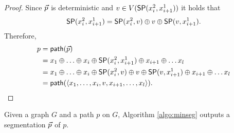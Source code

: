 \begin{proof}
Since $\sr{p}$ is deterministic and $v \in V(\sp(x^2_i, x^1_{i+1}))$ it holds that
$$
\sp(x^2_i, x^1_{i + 1}) = \sp(x^2_i, v) \oplus v \oplus \sp(v, x^1_{i + 1}).
$$
Therefore,
\begin{align*}
p & = \seq(\sr{p}) \\
  & = x_1 \oplus \ldots \oplus x_i \oplus \sp(x^2_i, x^1_{i + 1}) \oplus x_{i + 1} \oplus \ldots x_l \\
  & = x_1 \oplus \ldots \oplus x_i \oplus \sp(x^2_i, v) \oplus v \oplus \sp(v, x^1_{i + 1}) \oplus x_{i + 1} \oplus \ldots x_l \\
  & = \seq(\langle x_1, \ldots, x_i, v, x_{i + 1}, \ldots, x_l \rangle).
\end{align*}
\end{proof}

% 

\begin{proposition}
\label{prop:min-seg-feasible}
Given a graph $G$ and a path $p$ on $G$, Algorithm \ref{algo:minseg} outputs a segmentation $\sr{p}$ of $p$.
\end{proposition}

